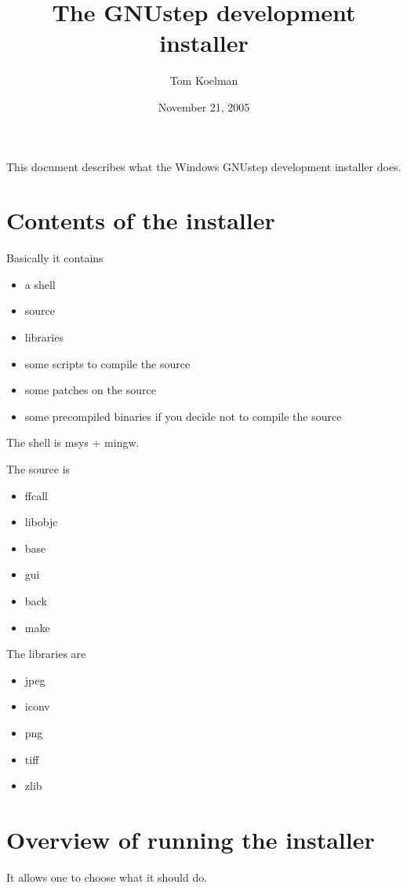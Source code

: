 \documentclass{article}
\begin{document}
\title{The GNUstep development installer}
\author{Tom Koelman}
\date{November 21, 2005}

\maketitle



This document describes what the Windows GNUstep development installer
does.

\section{Contents of the installer}

Basically it contains

\begin{itemize}
\item a shell
\item source
\item libraries
\item some scripts to compile the source
\item some patches on the source
\item some precompiled binaries if you decide not to compile the source
\end{itemize}

The shell is msys + mingw.

The source is

\begin{itemize}
\item ffcall
\item libobjc
\item base
\item gui
\item back
\item make
\end{itemize}

The libraries are

\begin{itemize}
\item jpeg
\item iconv
\item png
\item tiff
\item zlib
\end{itemize}


\section{Overview of running the installer}
It allows one to choose what it should do.
\end{document}
